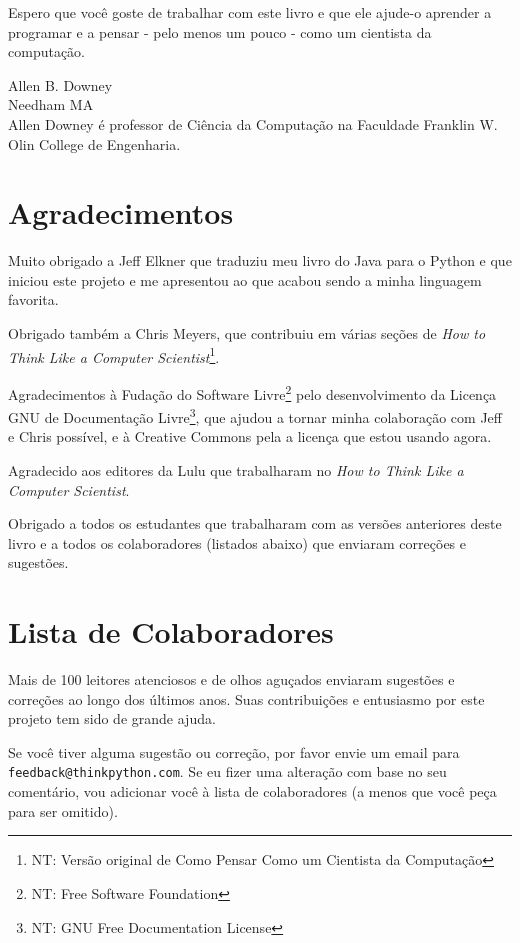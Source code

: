 \documentclass[10pt]{book}
\begin{document}
Espero que você goste de trabalhar com este livro e que ele ajude-o
aprender a programar e a pensar - pelo menos um pouco - como
um cientista da computação.


Allen B. Downey \\
Needham MA\\

Allen Downey é professor de Ciência da Computação na
Faculdade Franklin W. Olin College de Engenharia.


\section*{Agradecimentos}

Muito obrigado a Jeff Elkner que
traduziu meu livro do Java para o Python e que iniciou este
projeto e me apresentou ao que acabou sendo a minha
linguagem favorita.

Obrigado também a Chris Meyers, que contribuiu em várias seções
de {\em How to Think Like a Computer Scientist}\footnote{NT: Versão original de Como Pensar Como um Cientista da Computação}.

Agradecimentos à Fudação do Software Livre\footnote{NT: Free Software Foundation} pelo desenvolvimento
da Licença GNU de Documentação Livre\footnote{NT: GNU Free Documentation License}, que ajudou a tornar
minha colaboração com Jeff e Chris possível, e à Creative
Commons pela a licença que estou usando agora.

Agradecido aos editores da Lulu que trabalharam no
{\em How to Think Like a Computer Scientist}.

Obrigado a todos os estudantes que trabalharam com as versões
anteriores deste livro e a todos os colaboradores (listados
abaixo) que enviaram correções e sugestões.


\section*{Lista de Colaboradores}

Mais de 100 leitores atenciosos e de olhos aguçados enviaram
sugestões e correções ao longo dos últimos anos. Suas
contribuições e entusiasmo por este projeto tem sido de
grande ajuda.

Se você tiver alguma sugestão ou correção, por favor envie um email para 
{\tt feedback@thinkpython.com}. Se eu fizer uma alteração com base no seu
comentário, vou adicionar você à lista de colaboradores
(a menos que você peça para ser omitido).
\end{document}
